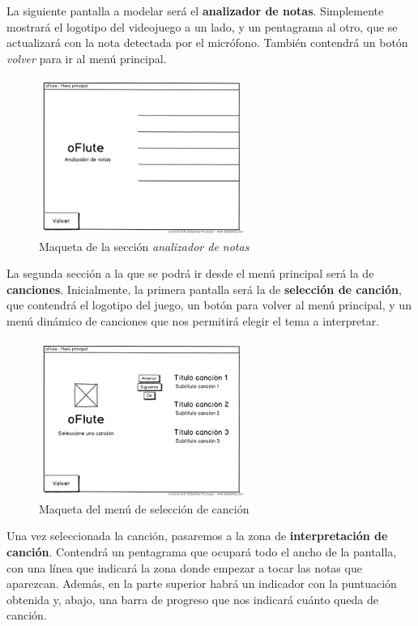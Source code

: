 La siguiente pantalla a modelar será el \textbf{analizador de
  notas}. Simplemente mostrará el logotipo del videojuego a un lado, y un
pentagrama al otro, que se actualizará con la nota detectada por el
micrófono. También contendrá un botón \textit{volver} para ir al menú principal.

\begin{figure}[h!]
  \centering
  \includegraphics[width=0.6\textwidth]{4_analisis/imagen_mockup_analizador}
  \caption{Maqueta de la sección \textit{analizador de notas}}
\end{figure}

La segunda sección a la que se podrá ir desde el menú principal será la de
\textbf{canciones}. Inicialmente, la primera pantalla será la de
\textbf{selección de canción}, que contendrá el logotipo del juego, un botón
para volver al menú principal, y un menú dinámico de canciones que nos permitirá
elegir el tema a interpretar.

\begin{figure}[h!]
  \centering
  \includegraphics[width=0.6\textwidth]{4_analisis/imagen_mockup_seleccionar_cancion}
  \caption{Maqueta del menú de selección de canción}
\end{figure}

Una vez seleccionada la canción, pasaremos a la zona de \textbf{interpretación
  de canción}. Contendrá un pentagrama que ocupará todo el ancho de la pantalla,
con una línea que indicará la zona donde empezar a tocar las notas que
aparezcan. Además, en la parte superior habrá un indicador con la puntuación
obtenida y, abajo, una barra de progreso que nos indicará cuánto queda de
canción.

